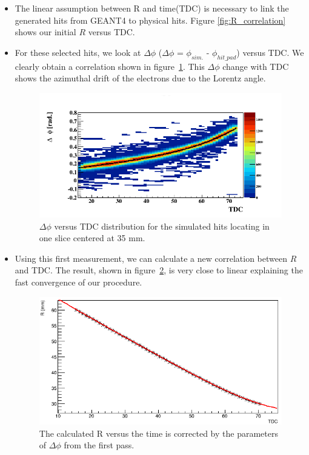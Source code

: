 \documentclass[twocolumn,showpacs,superscriptaddress,groupedaddress]{revtex4}
\begin{document}
\begin{itemize}

   \item The linear assumption between R and time(TDC) is necessary to link the 
      generated hits from GEANT4 to physical hits. Figure 
      \ref{fig:R_correlation} shows our initial $R$ versus TDC. 

   \item For these selected hits, we look at $\Delta\phi$ ($\Delta \phi$ = 
      $\phi_{sim.}$ - $\phi_{hit\_pad}$) versus TDC. We clearly obtain a 
      correlation shown in figure~\ref{fig:1st_pass_delta_phi}. This $\Delta 
      \phi$ change with TDC shows the azimuthal drift of the electrons due to 
      the Lorentz angle. 

      \begin{figure}[tb]
         \centering
         \includegraphics[scale=0.37]{fig/TdcPhi_p1_10.png}
         \caption{$\Delta \phi$ versus TDC distribution for the simulated hits 
         locating in one slice centered at 35 mm.}
         \label{fig:1st_pass_delta_phi}
      \end{figure}

   \item Using this first measurement, we can calculate a new correlation 
      between $R$ and TDC. The result, shown in figure~\ref{fig:R_TDC}, is very 
      close to linear explaining the fast convergence of our procedure. 


      \begin{figure}[tb]
         \centering
         \includegraphics[scale=0.37]{fig/R_TDC.png}
         \caption{The calculated R versus the time is corrected by the 
         parameters of $\Delta \phi$ from the first pass.}
         \label{fig:R_TDC}
      \end{figure}



\end{itemize}
\end{document}
